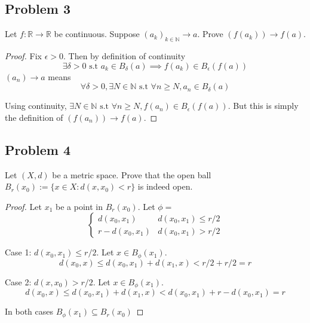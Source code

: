 \documentclass[12pt, a4paper]{article}
\newcommand{\mbr}{\mathbb{R}}
\newcommand{\mbn}{\mathbb{N}}
\newcommand {\ep}{\epsilon}
\newcommand {\st}{\text{ s.t }}
\begin{document}
\subsection*{Problem 3}
    {Let $f : \mbr \rightarrow \mbr$ be continuous. Suppose $(a_k)_{k \in \mbn} \rightarrow a$. Prove $(f(a_k)) \rightarrow f(a).$}
    \begin{proof} Fix $\ep > 0$. Then by definition of continuity 
       $$\exists \delta > 0 \st a_k \in B_\delta(a) \implies f(a_k) \in B_\ep(f(a))$$
       $(a_n) \rightarrow a$ means
       $$\forall \delta > 0, \exists N \in \mbn \st \forall n \ge N, a_n\in B_\delta(a)$$

       Using continuity, $\exists N \in \mbn \st \forall n \ge N, f(a_n) \in B_\ep(f(a))$.
       But this is simply the definition of $(f(a_n)) \rightarrow f(a).$
      
    \end{proof}
\pagebreak
\subsection*{Problem 4}
    Let $(X, d)$ be a metric space. Prove that the open ball $B_r(x_0) := \{x \in X : d(x, x_0) < r\}$
    is indeed open.
    \begin{proof}
        Let $x_1$ be a point in $B_r(x_0)$. Let $\phi =$ 
        \[ \begin{cases} 
            d(x_0,x_1) & d(x_0,x_1) \le r/2 \\
            r-d(x_0,x_1) & d(x_0,x_1) > r/2 
            \end{cases}
        \]
        

        Case 1: $d(x_0,x_1) \le r/2$. 
        Let $x \in B_\phi(x_1)$. 
        $$d(x_0, x) \le d(x_0, x_1) + d(x_1, x) < r/2 + r/2 = r$$

        Case 2: $d(x,x_0) > r/2$.
        Let $x \in B_\phi(x_1)$. 
        $$d(x_0, x) \le  d(x_0, x_1) + d(x_1, x) < d(x_0, x_1) + r-d(x_0, x_1) = r$$

        In both cases $B_\phi(x_1) \subseteq B_r(x_0)$
    \end{proof}
\end{document}
